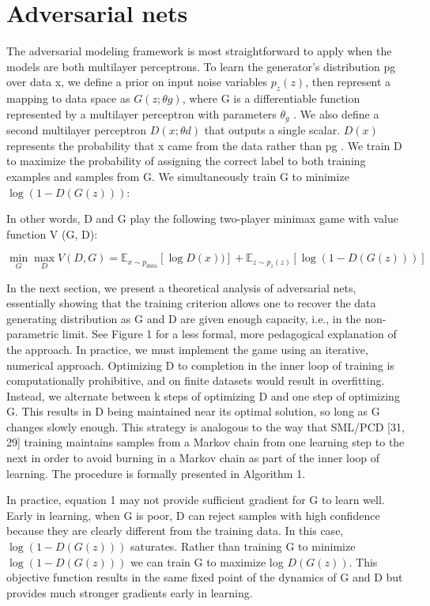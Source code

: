 \documentclass{article}
\begin{document}
\section{Adversarial nets}
The adversarial modeling framework is most straightforward to apply when the models are both multilayer perceptrons.
To learn the generator’s distribution pg over data x, we define a prior on input noise variables $p_z (z)$, 
then represent a mapping to data space as $G(z; \theta g )$, where G is a
differentiable function represented by a multilayer perceptron with parameters $\theta_g$ . We also define a
second multilayer perceptron $D(x; \theta d)$ that outputs a single scalar. $D(x)$ represents the probability
that x came from the data rather than pg . We train D to maximize the probability of assigning the
correct label to both training examples and samples from G. We simultaneously train G to minimize
$\log(1 - D(G(z)))$:


In other words, D and G play the following two-player minimax game with value function V (G, D):

\[
    \min_{G} \max_{D} V(D, G) = \mathbb{E}_{x\sim p_{data}}[\log D(x))] 
    + \mathbb{E}_{z\sim p_z(z)}[\log(1-D(G(z)))]
    \label{eqn1}
\]

\setlength{\parskip}{1em}
\noindent
In the next section, we present a theoretical analysis of adversarial nets, essentially showing that
the training criterion allows one to recover the data generating distribution as G and D are given
enough capacity, i.e., in the non-parametric limit. See Figure 1 for a less formal, more pedagogical
explanation of the approach. In practice, we must implement the game using an iterative, numerical
approach. Optimizing D to completion in the inner loop of training is computationally prohibitive,
and on finite datasets would result in overfitting. Instead, we alternate between k steps of optimizing
D and one step of optimizing G. This results in D being maintained near its optimal solution, so
long as G changes slowly enough. This strategy is analogous to the way that SML/PCD [31, 29]
training maintains samples from a Markov chain from one learning step to the next in order to avoid
burning in a Markov chain as part of the inner loop of learning. The procedure is formally presented
in Algorithm 1.

\setlength{\parskip}{1em}
\noindent
In practice, equation 1 may not provide sufficient gradient for G to learn well. Early in learning,
when G is poor, D can reject samples with high confidence because they are clearly different from
the training data. In this case, $\log(1 - D(G(z)))$ saturates. Rather than training G to minimize
$\log(1 - D(G(z)))$ we can train G to maximize log $D(G(z))$. This objective function results in the
same fixed point of the dynamics of G and D but provides much stronger gradients early in learning.
\end{document}
